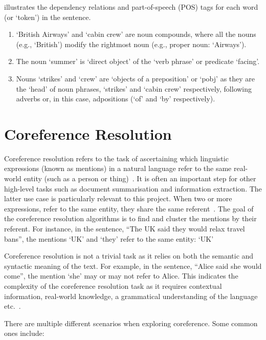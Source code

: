  illustrates the dependency relations and part-of-speech (POS) tags for each word (or `token') in the sentence. 

\begin{enumerate}
    \item `British Airways' and `cabin crew' are noun compounds, where all the nouns (e.g., `British') modify the rightmost noun (e.g., proper noun: `Airways').
    \item The noun `summer' is `direct object' of the `verb phrase' or predicate `facing'.
    \item Nouns `strikes' and `crew' are `objects of a preposition' or `pobj' as they are the `head' of noun phrases, `strikes' and `cabin crew' respectively, following adverbs or, in this case, adpositions (`of' and `by' respectively).

\end{enumerate}
 

\section{Coreference Resolution}

Coreference resolution refers to the task of ascertaining which linguistic expressions (known as mentions) in a natural language refer to the same real-world entity (such as a person or thing)~\cite{zheng2011coreference}. It is often an important step for other high-level tasks such as document summarisation and information extraction. The latter use case is particularly relevant to this project. When two or more expressions, refer to the same entity, they share the same referent~\cite{wiki_coref}. The goal of the coreference resolution algorithms is to find and cluster the mentions by their referent. For instance, in the sentence, ``The UK said they would relax travel bans'', the mentions `UK' and `they' refer to the same entity: `UK'

Coreference resolution is not a trivial task as it relies on both the semantic and syntactic meaning of the text. For example, in the sentence, ``Alice said she would come'', the mention `she' may or may not refer to Alice.  This indicates the complexity of the coreference resolution task as it requires contextual information, real-world knowledge, a grammatical understanding of the language etc.~\cite{zheng2011coreference}.

There are multiple different scenarios when exploring coreference. Some common ones include: 

